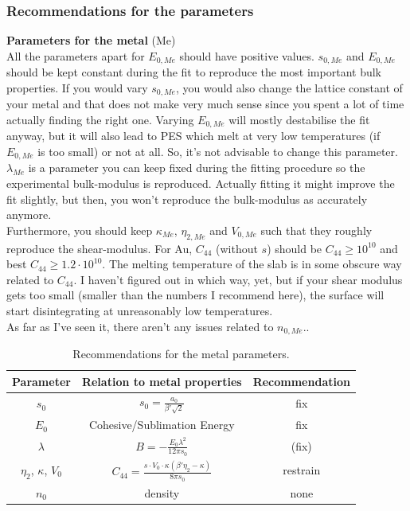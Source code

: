 \documentclass[11pt,oneside,a4paper, captions=nooneline, headsepline]{article}%
\begin{document}
\subsubsection*{Recommendations for the parameters}
\textbf{Parameters for the metal} (Me)\\
All the parameters apart for $E_{0,Me}$ should have positive values.
$s_{0,Me}$ and $E_{0,Me}$ should be kept constant during the fit to reproduce the most important bulk properties. If you would vary $s_{0,Me}$, you would also change the lattice constant of your metal and that does not make very much sense since you spent a lot of time actually finding the right one. Varying $E_{0,Me}$ will mostly destabilise the fit anyway, but it will also lead to PES which melt at very low temperatures (if $E_{0,Me}$ is too small) or not at all. So, it's not advisable to change this parameter. $\lambda_{Me}$ is a parameter you can keep fixed during the fitting procedure so the experimental bulk-modulus is reproduced. Actually fitting it might improve the fit slightly, but then, you won't reproduce the bulk-modulus as accurately anymore.\\
Furthermore, you should keep $\kappa_{Me}$, $\eta_{2,Me}$ and $V_{0,Me}$ such that they roughly reproduce the shear-modulus. For Au, $C_{44}$ (without $s$) should be $C_{44} \ge 10^{10}$ and best $C_{44} \ge 1.2 \cdot 10^{10}$. The melting temperature of the slab is in some obscure way related to $C_{44}$. I haven't figured out in which way, yet, but if your shear modulus gets too small (smaller than the numbers I recommend here), the surface will start disintegrating at unreasonably low temperatures.\\
As far as I've seen it, there aren't any issues related to $n_{0,Me}$..\\
\begin{table}[h!]
\centering
\caption{Recommendations for the metal parameters.}
\label{calsusi}
\begin{tabular}{ccc}
\hline\hline
Parameter&Relation to metal properties&Recommendation\\
\hline
$s_0$& $s_0= \frac{a_0}{\beta' \sqrt{2}}$& fix\\
$E_0$& Cohesive/Sublimation Energy& fix\\
$\lambda$&$B = -\frac{E_0 \lambda^2}{12 \pi s_0}$& (fix)\\
$\eta_2$, $\kappa$, $V_0$&$C_{44} = \frac{s\cdot V_0\cdot \kappa (\beta'\eta_2-\kappa)}{8\pi s_0}$& restrain\\
$n_0$& density& none\\
\hline\hline
\end{tabular}
\end{table}
\end{document}
